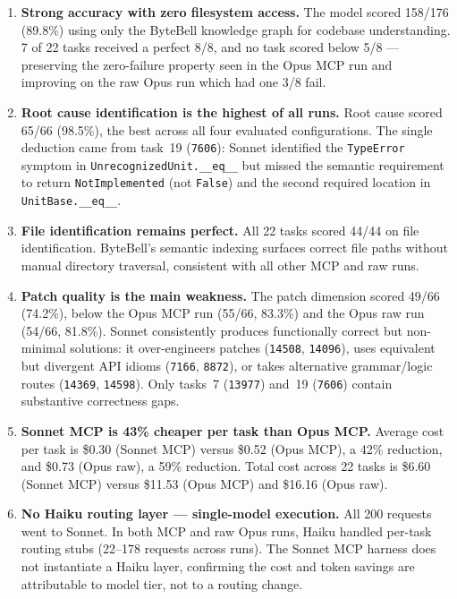 \begin{enumerate}

\item \textbf{Strong accuracy with zero filesystem access.}
      The model scored 158/176 (89.8\%) using only the ByteBell
      knowledge graph for codebase understanding.
      7 of 22 tasks received a perfect 8/8, and no task scored below
      5/8 --- preserving the zero-failure property seen in the Opus MCP
      run and improving on the raw Opus run which had one 3/8 fail.

\item \textbf{Root cause identification is the highest of all runs.}
      Root cause scored 65/66 (98.5\%), the best across all four
      evaluated configurations.  The single deduction came from
      task~19 (\texttt{7606}): Sonnet identified the \texttt{TypeError}
      symptom in \texttt{UnrecognizedUnit.\_\_eq\_\_} but missed the
      semantic requirement to return \texttt{NotImplemented} (not
      \texttt{False}) and the second required location in
      \texttt{UnitBase.\_\_eq\_\_}.

\item \textbf{File identification remains perfect.}
      All 22 tasks scored 44/44 on file identification.
      ByteBell's semantic indexing surfaces correct file paths
      without manual directory traversal, consistent with all other
      MCP and raw runs.

\item \textbf{Patch quality is the main weakness.}
      The patch dimension scored 49/66 (74.2\%), below the Opus MCP
      run (55/66, 83.3\%) and the Opus raw run (54/66, 81.8\%).
      Sonnet consistently produces functionally correct but
      non-minimal solutions: it over-engineers patches
      (\texttt{14508}, \texttt{14096}), uses equivalent but
      divergent API idioms (\texttt{7166}, \texttt{8872}), or takes
      alternative grammar/logic routes (\texttt{14369},
      \texttt{14598}).  Only tasks~7 (\texttt{13977}) and~19
      (\texttt{7606}) contain substantive correctness gaps.

\item \textbf{Sonnet MCP is 43\% cheaper per task than Opus MCP.}
      Average cost per task is \$0.30 (Sonnet MCP) versus \$0.52
      (Opus MCP), a 42\% reduction, and \$0.73 (Opus raw), a 59\%
      reduction.  Total cost across 22 tasks is \$6.60 (Sonnet MCP)
      versus \$11.53 (Opus MCP) and \$16.16 (Opus raw).

\item \textbf{No Haiku routing layer --- single-model execution.}
      All 200 requests went to Sonnet.  In both MCP and raw Opus
      runs, Haiku handled per-task routing stubs (22--178 requests
      across runs).  The Sonnet MCP harness does not instantiate a
      Haiku layer, confirming the cost and token savings are
      attributable to model tier, not to a routing change.


\end{enumerate}
